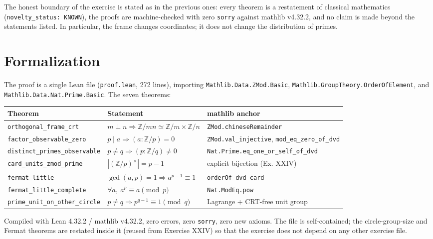 \documentclass[sigplan,10pt,anonymous,review]{acmart}
\begin{document}
The honest boundary of the exercise is stated as in the previous ones:
every theorem is a restatement of classical mathematics
(\texttt{novelty\_status: KNOWN}), the proofs are machine-checked with
zero \texttt{sorry} against mathlib v4.32.2, and no claim is made beyond
the statements listed. In particular, the frame changes coordinates; it
does not change the distribution of primes.

\section{Formalization}

The proof is a single Lean file (\texttt{proof.lean}, 272 lines),
importing \texttt{Mathlib.Data.ZMod.Basic},
\texttt{Mathlib.GroupTheory.OrderOfElement}, and
\texttt{Mathlib.Data.Nat.Prime.Basic}. The seven theorems:

\begin{center}
\begin{tabular}{lll}
\toprule
Theorem & Statement & mathlib anchor \\
\midrule
\texttt{orthogonal\_frame\_crt} & $m \perp n \Rightarrow \mathbb{Z}/mn \simeq \mathbb{Z}/m \times \mathbb{Z}/n$
  & \texttt{ZMod.chineseRemainder} \\
\texttt{factor\_observable\_zero} & $p \mid a \Rightarrow (a : \mathbb{Z}/p) = 0$
  & \texttt{ZMod.val\_injective}, \texttt{mod\_eq\_zero\_of\_dvd} \\
\texttt{distinct\_primes\_observable} & $p \ne q \Rightarrow (p : \mathbb{Z}/q) \ne 0$
  & \texttt{Nat.Prime.eq\_one\_or\_self\_of\_dvd} \\
\texttt{card\_units\_zmod\_prime} & $|(\mathbb{Z}/p)^\times| = p-1$
  & explicit bijection (Ex. XXIV) \\
\texttt{fermat\_little} & $\gcd(a,p)=1 \Rightarrow a^{p-1} \equiv 1$
  & \texttt{orderOf\_dvd\_card} \\
\texttt{fermat\_little\_complete} & $\forall a,\ a^p \equiv a \pmod p$
  & \texttt{Nat.ModEq.pow} \\
\texttt{prime\_unit\_on\_other\_circle} & $p \ne q \Rightarrow p^{q-1} \equiv 1 \pmod q$
  & Lagrange + CRT-free unit group \\
\bottomrule
\end{tabular}
\end{center}

Compiled with Lean 4.32.2 / mathlib v4.32.2, zero errors, zero
\texttt{sorry}, zero new axioms. The file is self-contained; the
circle-group-size and Fermat theorems are restated inside it (reused
from Exercise XXIV) so that the exercise does not depend on any other
exercise file.
\end{document}
